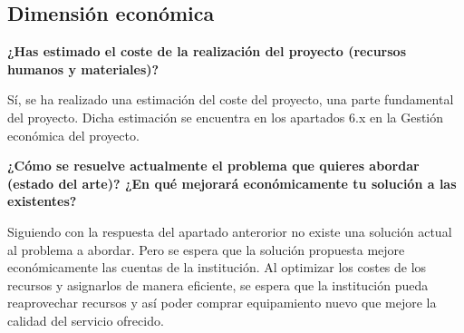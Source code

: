 \subsection{Dimensión económica}

\textbf{¿Has estimado el coste de la realización del proyecto (recursos humanos
y materiales)?}

Sí, se ha realizado una estimación del coste del proyecto, una parte fundamental del proyecto.
Dicha estimación se encuentra en los apartados 6.x en la Gestión económica del proyecto.

\textbf{¿Cómo se resuelve actualmente el problema que quieres abordar (estado del arte)? 
¿En qué mejorará económicamente tu solución a las existentes?}

Siguiendo con la respuesta del apartado anterorior no existe una solución actual al problema a abordar.
Pero se espera que la solución propuesta mejore económicamente las cuentas de la institución. Al optimizar
los costes de los recursos y asignarlos de manera eficiente, se espera que la institución pueda reaprovechar
recursos y así poder comprar equipamiento nuevo que mejore la calidad del servicio ofrecido.